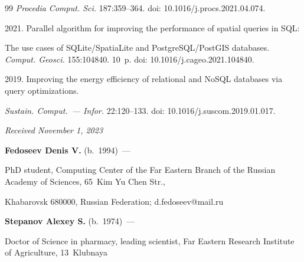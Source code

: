 {{\begin{thebibliography}{99}
  \textit{Procedia Comput. Sci.} 187:359--364. doi: 10.1016\!/\!j.procs.2021.04.074.


 2021. Parallel algorithm for improving the performance of spatial queries in SQL:

 The use cases of SQLite/SpatiaLite and PostgreSQL/PostGIS databases.  \textit{Comput. Geosci.} 155:104840. 10~p. doi: 10.1016\!/\!j.cageo.2021.104840.



 2019. Improving the energy efficiency of relational and NoSQL databases via query optimizations. 

 \textit{Sustain. Comput.~--- Infor.} 22:120--133. doi: 10.1016\!/\!j.suscom.2019.01.017.



\end{thebibliography}

} }



\vspace*{-6pt}



\hfill{\small\textit{Received November 1, 2023}} 



\vspace*{-14pt} 



\Contr



\vspace*{-3pt}



\noindent

\textbf{Fedoseev Denis V.} (b.\ 1994)~--- 

PhD student, Computing Center of the Far Eastern Branch of the Russian Academy of Sciences, 65~Kim Yu Chen Str., 

Khabarovsk 680000, Russian Federation; \mbox{d.fedoseev@mail.ru}



\vspace*{3pt}



\noindent

\textbf{Stepanov Alexey S.} (b.\ 1974)~--- 

Doctor of Science in pharmacy, leading scientist, Far Eastern Research Institute of Agriculture, 13~Klubnaya 


